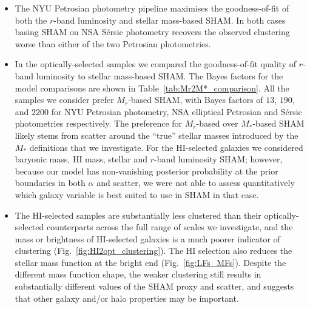 \documentclass[usenatbib,useAMS]{mnras}
\newcommand{\HI}{\ensuremath{\mathrm{H}\scriptstyle\mathrm{I}}}
\begin{document}
\begin{itemize}
    \item The \ac{NYU} Petrosian photometry pipeline maximises the goodness-of-fit of both the $r$-band luminosity and stellar mass-based \ac{SHAM}. In both cases basing \ac{SHAM} on \ac{NSA} S\'ersic photometry recovers the observed clustering worse than either of the two Petrosian photometries.
    \item In the optically-selected samples we compared the goodness-of-fit quality of $r$-band luminosity to stellar mass-based \ac{SHAM}.
    The Bayes factors for the model comparisons are shown in Table~\ref{tab:Mr2M*_comparison}. All the samples we consider prefer $M_r$-based \ac{SHAM}, with Bayes factors of $13$, $190$, and $2200$ for \ac{NYU} Petrosian photometry, \ac{NSA} elliptical Petrosian and S\'ersic photometries respectively. The preference for $M_r$-based over $M_*$-based \ac{SHAM} likely stems from scatter around the ``true'' stellar masses introduced by the $M_*$ definitions that we investigate. For the $\HI$-selected galaxies we considered baryonic mass, $\HI$ mass, stellar and $r$-band luminosity \ac{SHAM}; however, because our model has non-vanishing posterior probability at the prior boundaries in both $\alpha$ and scatter, we were not able to assess quantitatively which galaxy variable is best suited to use in \ac{SHAM} in that case.
    \item The $\HI$-selected samples are substantially less clustered than their optically-selected counterparts across the full range of scales we investigate, and the mass or brightness of $\HI$-selected galaxies is a much poorer indicator of clustering (Fig.~\ref{fig:HI2opt_clustering}). The $\HI$ selection also reduces the stellar mass function at the bright end (Fig.~\ref{fig:LFs_MFs}). Despite the different mass function shape, the weaker clustering still results in substantially different values of the \ac{SHAM} proxy and scatter, and suggests that other galaxy and/or halo properties may be important.
\end{itemize}
\end{document}
